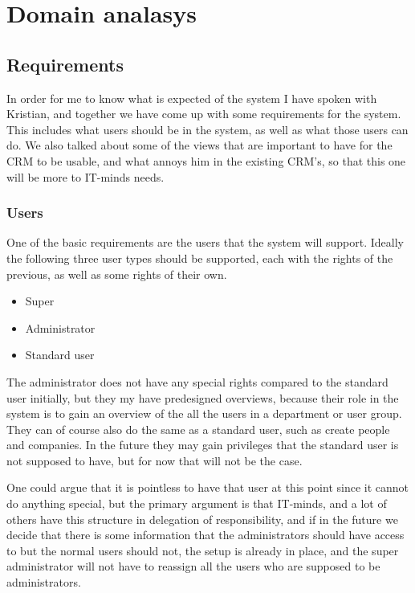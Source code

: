 \chapter{Domain analasys}
\label{chap:Domain analasys}

\section{Requirements}
\label{sec:Requirements}
In order for me to know what is expected of the system I have spoken with Kristian, and together we have come up with some requirements for the system. This includes what users should be in the system, as well as what those users can do. We also talked about some of the views that are important to have for the CRM to be usable, and what annoys him in the existing CRM's, so that this one will be more to IT-minds needs.

\subsection{Users}
\label{sub:Users}

One of the basic requirements are the users that the system will support. Ideally the following three user types should be supported, each with the rights of the previous, as well as some rights of their own.

\begin{itemize}
  \item Super
  \item Administrator
  \item Standard user
\end{itemize}

The administrator does not have any special rights compared to the standard user initially, but they my have predesigned overviews, because their role in the system is to gain an overview of the all the users in a department or user group. They can of course also do the same as a standard user, such as create people and companies. In the future they may gain privileges that the standard user is not supposed to have, but for now that will not be the case.

One could argue that it is pointless to have that user at this point since it cannot do anything special, but the primary argument is that IT-minds, and a lot of others have this structure in delegation of responsibility, and if in the future we decide that there is some information that the administrators should have access to but the normal users should not, the setup is already in place, and the super administrator will not have to reassign all the users who are supposed to be administrators.


